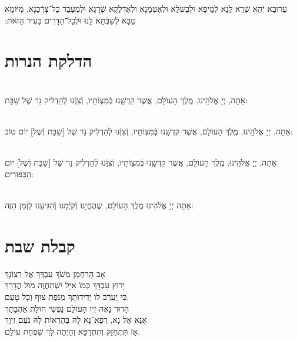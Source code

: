 \documentclass[twoside, openany, parskip=half, 11pt]{book}
\begin{document}
 עֵרוּבָא יְֿהֵא שְֿׁרֵא לַֽנָא לְֿמֵיפֵא וּלְבַשּּׁלָא וּלְאַטְמָנָא וּלְאַדְלָקָא שְֿׁרָגָא וּלְמֶעְבַּד כָּל־צָרְֿכָּנָא, מִיּוֹמָא טָבָא לְֿשַׁבְּֿֿתָא לָֽנוּ וּלְכׇל־הַדָּרִים בָּעִיר הַזּׂאת:‏


\vspace{\baselineskip}
{\let\clearpage\relax
\chapter[הדלקת הנרות שבת ויום טוב]{ הדלקת הנרות }}

\\
 אַתָה, יְיָ אֱלֹהֵֽינוּ, מֶֽלֶךְ הָעוֹלָם, אֲשֶׁר קִדְשָֽׁנוּ בְּֿמִצְוֹתָיו, וְֿצִוְּֽֿנוּ לְֿהַדְלִיק נֵר שֶׁל שַׁבָּת:

\\
 אַתָה, יְיָ אֱלֹהֵֽינוּ, מֶֽלֶךְ הָעוֹלָם, אֲשֶׁר קִדְשָֽׁנוּ בְּֿמִצְוֹתָיו, וְֿצִוְּֽֿנוּ לְֿהַדְלִיק נֵר שֶׁל
[שַׁבָּת וְֿשֶׁל] יוֹם טוֹב:

\\
 אַתָה, יְיָ אֱלֹהֵֽינוּ, מֶֽלֶךְ הָעוֹלָם, אֲשֶׁר קִדְשָֽׁנוּ בְּֿמִצְוֹתָיו, וְֿצִוְּֽֿנוּ לְֿהַדְלִיק נֵר שֶׁל
[שַׁבָּת וְֿשֶׁל] יוֹם הַכִּפּוּרִים:

\\
 אַתָּה יְיָ אֱלֹהֵינוּ מֶלֶךְ הָעוֹלָם, שֶׁהֶחֱיָנוּ וְֿקִיְּֿֿמָנוּ וְֿהִגִּיעָנוּ לַזְמַן הַזֶּה:



\chapter[קבלת שבת]{ קבלת שבת }
\label{kabalas_shabbos}

	אָב הָרַחְמָן מְשֹׁךְ עַבְדָּךְ אֶל רְצוֹנָךְ\\
	יָרוּץ עַבְדָּךְ כְּמוֹ אַיָּל	יִשְׁתַּחֲוֶה מוּל הֲדָרָךְ\\
	כִּי יֶעְרַב לוֹ יְדִידוּתָךְ מִנֹּפֶת צוּף וְכָל טָעַם.\\
	
	
	הָדוּר נָאֶה זִיו הָעוֹלָם נַפְשִׁי חוֹלַת אַהֲבָתָךְ\\
	אָנָּא אֵל נָא, רְפָא־נָא לָהּ בְּהַרְאוֹת לָהּ נֹעַם זִיוָךְ\\
	אָז תִּתְחַזֵּק וְתִתְרַפֵּא וְהָיְתָה לָּךְ שִׁפְחַת עוֹלָם.\\
	
\end{document}
